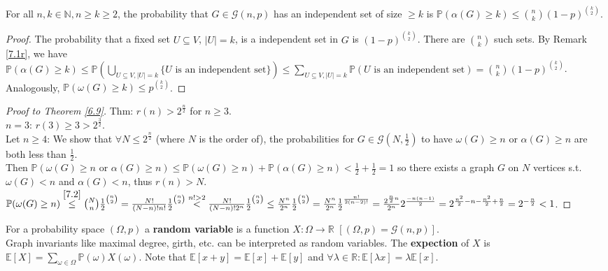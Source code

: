 \begin{lemma}\label{7.2}
    For all $n,k\in\mathbb{N},n\geq k\geq2$, the probability that $G\in\mathcal{G}(n,p)$ has an independent set of size $\geq k$ is $\mathbb{P}(\alpha(G)\geq k)\leq \binom{n}{k}(1-p)^{\binom{k}{2}}$.
\end{lemma}
\begin{proof}
    The probability that a fixed set $U\subseteq V$, $|U|=k$, is a independent set in $G$ is $(1-p)^{\binom{k}{2}}$. There are $\binom{n}{k}$ such sets. By Remark \ref{7.1r}, we have $\mathbb{P}(\alpha(G)\geq k)\leq \mathbb{P}(\bigcup\limits_{U\subseteq V,|U|=k}\{U\text{ is an independent set}\})\leq \sum\limits_{U\subseteq V,|U|=k}\mathbb{P}(U\text{ is an independent set})=\binom{n}{k}(1-p)^{\binom{k}{2}}$.\\
    Analogously, $\mathbb{P}(\omega(G)\geq k)\leq p^{\binom{k}{2}}$.
\end{proof}
\begin{proof}[Proof to Theorem \ref{6.9}]\label{6.9p}
    Thm: $r(n) > 2^{\frac{n}{2}}$ for $n\geq 3$.\\
    $n=3$: $r(3)\geq 3>2^{\frac{3}{2}}$.\\
    Let $n\geq 4$: We show that $\forall N\leq 2^{\frac{n}{2}}$ (where $N$ is the order of), the probabilities for $G\in\mathcal{G}(N,\frac{1}{2})$ to have $\omega(G)\geq n$ or $\alpha(G)\geq n$ are both less than $\frac{1}{2}$.\\
    Then $\mathbb{P}(\omega(G)\geq n\text{ or }\alpha(G)\geq n)\leq \mathbb{P}(\omega(G)\geq n)+\mathbb{P}(\alpha(G)\geq n)<\frac{1}{2}+\frac{1}{2}=1$ so there exists a graph $G$ on $N$ vertices s.t. $\omega(G)<n$ and $\alpha(G)<n$, thus $r(n)>N$.\\
    $\mathbb{P}(\omega(G)\geq n)\stackrel{\ref{7.2}}{\leq} \binom{N}{n}\frac{1}{2}^{\binom{n}{2}}=\frac{N!}{(N-n)!n!}\frac{1}{2}^{\binom{n}{2}}\stackrel{n!>2}{<}\frac{N!}{(N-n)!2^n}\frac{1}{2}^{\binom{n}{2}}\leq\frac{N^n}{2^n}\frac{1}{2}^{\binom{n}{2}}=\frac{N^n}{2^n}\frac{1}{2}^{\frac{n!}{2(n-2)!}}=\frac{2^{\frac{n}{2}n}}{2^n}2^\frac{-n(n-1)}{2}=2^{\frac{n^2}{2}-n-\frac{n^2}{2}+\frac{n}{2}}=2^{-\frac{n}{2}}<1$.
\end{proof}
\begin{definition*}
    For a probability space $(\Omega,p)$ a \textbf{random variable} is a function $X:\Omega\rightarrow\mathbb{R}$ $[(\Omega,p)=\mathcal{G}(n,p)]$.\\
    Graph invariants like maximal degree, girth, etc. can be interpreted as random variables. The \textbf{expection} of $X$ is $\mathbb{E}[X]=\sum\limits_{\omega\in\Omega}\mathbb{P}(\omega)X(\omega)$. Note that $\mathbb{E}[x+y]=\mathbb{E}[x]+\mathbb{E}[y]$ and $\forall \lambda\in\mathbb{R}:\mathbb{E}[\lambda x]=\lambda\mathbb{E}[x]$.
\end{definition*}
